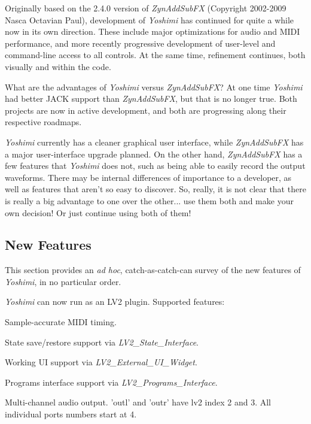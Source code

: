\documentclass[
 11pt,
 twoside,
 a4paper,
 final                                 %
]{article}
\begin{document}
   Originally based on the 2.4.0 version of \textsl{ZynAddSubFX} (Copyright
   2002-2009 Nasca Octavian Paul), development of \textsl{Yoshimi} has
   continued for quite a while now in its own direction. These include
   major optimizations for audio and MIDI performance, and more recently
   progressive development of user-level and command-line access to all
   controls. At the same time, refinement continues, both visually and within
   the code.

   What are the advantages of
   \textsl{Yoshimi} versus \textsl{ZynAddSubFX}?
   At one time \textsl{Yoshimi} had better JACK support
   than \textsl{ZynAddSubFX}, but that is no longer true.
   Both projects are now in active development, and both are
   progressing along their respective roadmaps.

   \textsl{Yoshimi} currently has a cleaner graphical user interface, while
   \textsl{ZynAddSubFX} has a major user-interface upgrade planned.
   On the other hand, \textsl{ZynAddSubFX} has a few features that
   \textsl{Yoshimi} does not, such as being able to easily record
   the output waveforms.  There may be internal differences of importance to
   a developer, as well as features that aren't so easy to discover.  So,
   really, it is not clear that there is really a big advantage to one over the
   other... use them both and make your own decision!  Or just continue using
   both of them!

\subsection{New Features}
\label{subsec:introduction_new_features}

   This section provides an \textsl{ad hoc}, catch-as-catch-can survey of the
   new features of \textsl{Yoshimi}, in no particular order.

   \textsl{Yoshimi} can now run as an LV2 plugin.  Supported features:

   \begin{enumber}
      \item Sample-accurate MIDI timing.
      \item State save/restore support via \textsl{LV2\_State\_Interface}.
      \item Working UI support via \textsl{LV2\_External\_UI\_Widget}.
      \item Programs interface support via \textsl{LV2\_Programs\_Interface}.
      \item Multi-channel audio output.
         'outl' and 'outr' have lv2 index 2 and 3.
         All individual ports numbers start at 4.
   \end{enumber}
\end{document}
